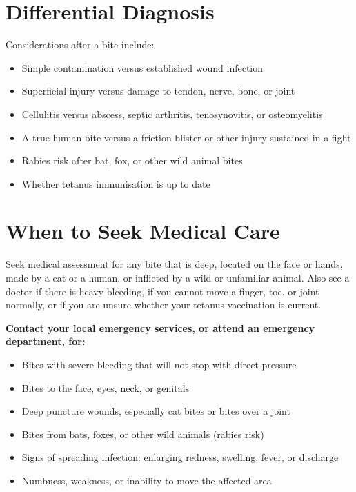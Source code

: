 \section*{Differential Diagnosis}
Considerations after a bite include:

\begin{itemize}
    \item Simple contamination versus established wound infection
    \item Superficial injury versus damage to tendon, nerve, bone, or joint
    \item Cellulitis versus abscess, septic arthritis, tenosynovitis, or osteomyelitis
    \item A true human bite versus a friction blister or other injury sustained in a fight
    \item Rabies risk after bat, fox, or other wild animal bites
    \item Whether tetanus immunisation is up to date
\end{itemize}

\section*{When to Seek Medical Care}
Seek medical assessment for any bite that is deep, located on the face or hands, made by a cat or a human, or inflicted by a wild or unfamiliar animal. Also see a doctor if there is heavy bleeding, if you cannot move a finger, toe, or joint normally, or if you are unsure whether your tetanus vaccination is current.

\textbf{Contact your local emergency services, or attend an emergency department, for:}
\begin{itemize}
    \item Bites with severe bleeding that will not stop with direct pressure
    \item Bites to the face, eyes, neck, or genitals
    \item Deep puncture wounds, especially cat bites or bites over a joint
    \item Bites from bats, foxes, or other wild animals (rabies risk)
    \item Signs of spreading infection: enlarging redness, swelling, fever, or discharge
    \item Numbness, weakness, or inability to move the affected area
\end{itemize}

